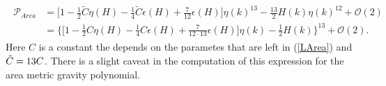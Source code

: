 \documentclass[a4paper,12pt, DIV=14, BCOR=5mm, twoside, headsepline]{scrbook}
\begin{document}
\begin{align} \label{AreaPoly}
\begin{aligned}
    \mathcal{P}_{Area} &= \bigl[1 - \frac{1}{2} \tilde{C}\eta(H) - \frac{1}{4} \tilde{C} \epsilon(H) + \frac{7}{12} \epsilon(H) \bigr] \eta(k)^{13} - \frac{13}{2}H(k) \eta(k)^{12} + \mathcal{O}(2) \\
    &=\bigl\{  \bigl[ 1 - \frac{1}{2} C \eta(H) - \frac{1}{4} C \epsilon(H) +  \frac{7}{12\cdot13} \epsilon(H) \bigr] \eta(k) - \frac{1}{2} H(k)       \bigr\}^{13} + \mathcal{O}(2).
\end{aligned}
\end{align}
Here $C$ is a constant the depends on the parametes that are left in (\ref{LArea}) and $\Tilde{C} = 13 C$.
There is a slight caveat in the computation of this expression for the area metric gravity polynomial. 
\end{document}
